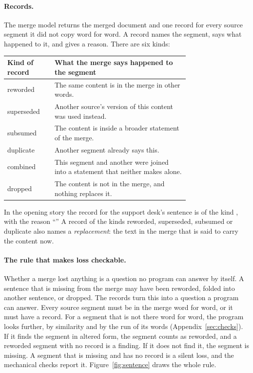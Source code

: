 \paragraph{Records.} The merge model returns the merged document and one record for every source segment it did not copy word for word. A record names the segment, says what happened to it, and gives a reason. There are six kinds:

\begin{center}\small
\begin{tabular}{@{}lp{0.74\linewidth}@{}}
\toprule
Kind of record & What the merge says happened to the segment \\
\midrule
reworded & The same content is in the merge in other words. \\
superseded & Another source's version of this content was used instead. \\
subsumed & The content is inside a broader statement of the merge. \\
duplicate & Another segment already says this. \\
combined & This segment and another were joined into a statement that neither makes alone. \\
dropped & The content is not in the merge, and nothing replaces it. \\
\bottomrule
\end{tabular}
\end{center}

\noindent In the opening story the record for the support desk's sentence is of the kind \emph{}, with the reason ``'' A record of the kinds reworded, superseded, subsumed or duplicate also names a \emph{replacement}: the text in the merge that is said to carry the content now.

\paragraph{The rule that makes loss checkable.} Whether a merge lost anything is a question no program can answer by itself. A sentence that is missing from the merge may have been reworded, folded into another sentence, or dropped. The records turn this into a question a program can answer. Every source segment must be in the merge word for word, or it must have a record. For a segment that is not there word for word, the program looks further, by similarity and by the run of its words (Appendix~\ref{sec:checks}). If it finds the segment in altered form, the segment counts as reworded, and a reworded segment with no record is a finding. If it does not find it, the segment is missing. A segment that is missing and has no record is a silent loss, and the mechanical checks report it. Figure~\ref{fig:sentence} draws the whole rule.


